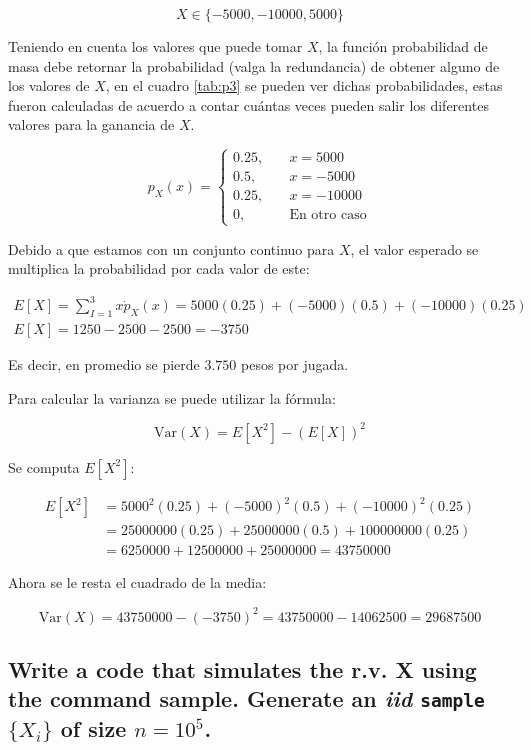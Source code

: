\documentclass[12pt]{article}\usepackage[]{graphicx}\usepackage[]{xcolor}
\begin{document}
\[
X \in \{-5000, -10000, 5000  \} 
\]

Teniendo en cuenta los valores que puede tomar $X$, la función probabilidad de masa debe retornar la probabilidad (valga la redundancia) de obtener alguno de los valores de $X$, en el cuadro \ref{tab:p3} se pueden ver dichas probabilidades, estas fueron calculadas de acuerdo a contar cuántas veces pueden salir los diferentes valores para la ganancia de $X$.

\[
p_{X} (x)  =
\begin{cases}
  0.25,& \quad x = 5000 \\
  0.5,&  \quad x = -5000 \\
  0.25,& \quad x = -10000 \\
  0,& \quad \text{En otro caso}
\end{cases}
\]

Debido a que estamos con un conjunto continuo para $X$, el valor esperado se multiplica la probabilidad por cada valor de este:

\begin{gather*}
  E[X] = \sum_{I=1}^{3} x \dot p_{X}(x) = 5000(0.25) + (-5000)(0.5) + (-10000)(0.25) \\
  E[X] = 1250 - 2500 - 2500 = -3750
\end{gather*}

Es decir, en promedio se pierde $3.750$ pesos por jugada.

Para calcular la varianza se puede utilizar la fórmula:

\[
\mathrm{Var}(X) = E[X^{2}] - (E[X])^{2}
\]

Se computa $E[X^{2}]$:

\begin{align*}
  E[X^{2}] &= 5000^{2}(0.25) + (-5000)^{2}(0.5) + (-10000)^{2}(0.25) \\
           &= 25000000 (0.25) + 25000000 (0.5) + 100000000 (0.25) \\
  &= 6250000 + 12500000 + 25000000 = 43750000
\end{align*}

Ahora se le resta el cuadrado de la media:

\[
\mathrm{Var}(X) = 43750000 - (-3750)^{2} = 43750000 - 14062500 = 29687500
\]






\subsection{Write a code that simulates the r.v. \textbf{X} using the command sample. Generate an \textit{iid} \lstinline|sample| $\{X_{i}\}$ of size $n = 10^{5}$.}
\end{document}
